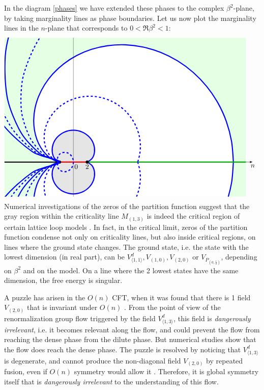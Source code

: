 \documentclass[12pt, a4paper]{article}
\theoremstyle{break}
\begin{document}
In the diagram \eqref{phases} we have extended these phases to the complex $\beta^2$-plane, by taking marginality lines as phase boundaries. Let us now plot the marginality lines in the $n$-plane that corresponds to $0<\Re \beta^2<1$:
\newcommand{\margs}[2]{
\draw[domain = {-2/(#1-1)}:{2/(#1-1)}, smooth, variable = \t, #2]
plot({-2*cos(pi/2*(#1-1)*\t r)*cosh(pi/2*(#1-1)*sqrt(abs(\t)-\t*\t)}, {2*sin(pi/2*(#1-1)*\t r)*sinh(pi/2*(#1-1)*sqrt(abs(\t)-\t*\t)});
}
\begin{align}
 \begin{tikzpicture}[baseline=(current  bounding  box.center), scale = .35]
\clip (-10, 18) -- (27, 18) -- (27, -5) -- (-10, -5) -- cycle;
\fill [color = green!10] (-10, 18) -- (25, 18) -- (25, -5) -- (-10, -5) -- cycle;
\margs{5}{ultra thick, blue, samples = 50, fill = white}
\margs{3}{ultra thick, blue, fill = black!10}
\draw[-latex] (-10, 0) -- (26, 0) node[below]{$n$};
\draw (0, -5) -- (0, 18);
\draw[ultra thick, green!70!black] (2, 0) -- (25, 0);
\draw [ultra thick] (-10, 0) -- (-2, 0);
\draw [ultra thick, red] (-2, 0) -- (2, 0); 
\node[below right] at (-.2, 0) {$0$};
\node[below] at (2, 0) {$2$};
\node at (2, 0) [fill, circle, scale = .5] {};
\node at (-2, 0) [fill, circle, scale = .5] {};
 \draw[domain = 0:360, smooth, variable = \t, samples = 30, ultra thick, dashed, blue]
   plot({-2*sin(pi*(1+cos(\t))/4 r)*cosh(pi*sin(\t)/4)}, {2*cos(pi*(1+cos(\t))/4 r)*sinh(pi*sin(\t)/4)});
 \margs{4}{ultra thick, dashed, blue, samples = 50}
\margs{6}{ultra thick, dashed, blue}
\margs{7}{ultra thick, blue}
\margs{8}{ultra thick, dashed, blue}
\margs{9}{ultra thick, blue}
\end{tikzpicture}
\end{align}
Numerical investigations of the zeros of the partition function suggest that the gray region within the criticality line $M_{(1,3)}$ is indeed the critical region of certain lattice loop models \cite{bjjz22}. 
In fact, in the critical limit, zeros of the partition function condense not only on criticality lines, but also inside critical regions, on lines where the ground state changes. The ground state, i.e. the state with the lowest dimension (in real part), can be $V^d_{\langle 1,1\rangle}, V_{(1, 0)}, V_{(2,0)}$ or $V_{P_{(0,\frac12)}}$, depending on $\beta^2$ and on the model. On a line where the 2 lowest states have the same dimension, the free energy is singular. 

A puzzle has arisen in the $O(n)$ CFT, when it was found that there is 1 field $V_{(2,0)}$ that is invariant under $O(n)$ \cite{gz20}. From the point of view of the renormalization group flow triggered by the field $V^d_{\langle 1,3\rangle}$, this field is \textit{dangerously irrelevant}, i.e. it becomes relevant along the flow, and could prevent the flow from reaching the dense phase from the dilute phase. But numerical studies show that the flow does reach the dense phase. The puzzle is resolved by noticing that $V^d_{\langle 1,3\rangle}$ is degenerate, and cannot produce the non-diagonal field $V_{(2,0)}$ by repeated fusion, even if $O(n)$ symmetry would allow it \cite{js23}. Therefore, it is global symmetry itself that is \textit{dangerously irrelevant} to the understanding of this flow. 
\end{document}
